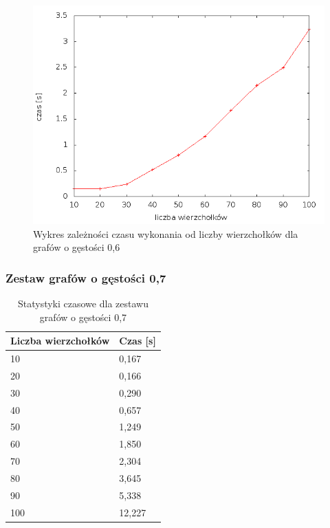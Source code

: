 \documentclass[12pt, a4paper]{article}
\begin{document}
\begin{figure}[h]
    \begin{center}
	\includegraphics[scale=0.5]{results/img/den/den_06.png}
	\caption{Wykres zależności czasu wykonania od liczby wierzchołków dla grafów o gęstości 0,6}
    \end{center}
\end{figure}

\subsubsection*{Zestaw grafów o gęstości 0,7}
\begin{table}[H]
\caption{Statystyki czasowe dla zestawu grafów o gęstości 0,7}
\begin{center}
    \begin{tabular}{|l|l|}
    \hline
    Liczba wierzchołków & Czas [s] \\ \hline
    10 & 0,167 \\ \hline
    20 & 0,166 \\ \hline
    30 & 0,290 \\ \hline
    40 & 0,657 \\ \hline
    50 & 1,249 \\ \hline
    60 & 1,850 \\ \hline
    70 & 2,304 \\ \hline
    80 & 3,645 \\ \hline
    90 & 5,338 \\ \hline
    100 & 12,227 \\ \hline
    \end{tabular}
\end{center}
\end{table}
\end{document}
